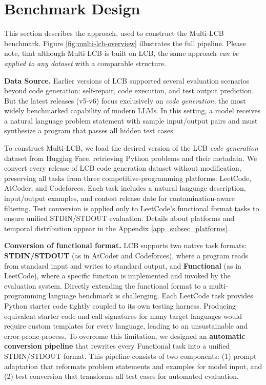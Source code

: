 \documentclass{llmxive}
\begin{document}
\section{Benchmark Design}
\label{sec_bench}
This section describes the approach, used to construct the Multi-LCB benchmark. Figure \ref{fig:multi-lcb-overview} illustrates the full pipeline. %
Please note, that although Multi-LCB is built on LCB, the same approach \textit{can be applied to any dataset} with a comparable structure.



\textbf{Data Source.} Earlier versions of LCB supported several evaluation scenarios beyond code generation: self-repair, code execution, and test output prediction. But the latest releases (v5-v6) focus exclusively on \textit{code generation}, the most widely benchmarked capability of modern LLMs. In this setting, a model receives a natural language problem statement with sample input/output pairs and must synthesize a program that passes all hidden test cases.

To construct Multi-LCB, we load the desired version of the LCB \textit{code generation} dataset from Hugging Face, retrieving Python problems and their metadata. We convert every release of LCB code generation dataset without modification, preserving all tasks from three competitive-programming platforms: LeetCode, AtCoder, and Codeforces. Each task includes a natural language description, input/output examples, and contest release date for contamination-aware filtering. Test conversion is applied only to LeetCode's functional format tasks to ensure unified STDIN/STDOUT evaluation. Details about platforms and temporal distribution appear in the Appendix \ref{app_subsec_platforms}.


\textbf{Conversion of functional format.} LCB supports two native task formats: \textbf{STDIN/STDOUT} (as in AtCoder and Codeforces), where a program reads from standard input and writes to standard output, and \textbf{Functional} (as in LeetCode), where a specific function is implemented and invoked by the evaluation system.
Directly extending the functional format to a multi-programming language benchmark is challenging.
Each LeetCode task provides Python starter code tightly coupled to its own testing harness. Producing equivalent starter code and call signatures for many target languages would require custom templates for every language, leading to an unsustainable and error-prone process.
To overcome this limitation, we designed an \textbf{automatic conversion pipeline} that rewrites every Functional task into a unified STDIN/STDOUT format. This pipeline consists of two components: (1) prompt adaptation that reformats problem statements and examples for model input, and (2) test conversion that transforms all test cases for automated evaluation.
\end{document}
